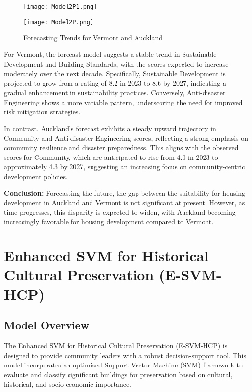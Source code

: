 \documentclass{mcmthesis}
\begin{document}
\begin{figure}[h]
    \centering
    \begin{minipage}{.5\textwidth}
        \centering
        \texttt{[image: Model2P1.png]} %
        \label{fig:vermont_forecast}
    \end{minipage}%
    \begin{minipage}{.5\textwidth}
        \centering
        \texttt{[image: Model2P.png]} %
        \label{fig:auckland_forecast}
    \end{minipage}
    \caption{Forecasting Trends for Vermont and Auckland}
    \label{fig:forecasts}
\end{figure}

For Vermont, the forecast model suggests a stable trend in Sustainable Development and Building Standards, with the scores expected to increase moderately over the next decade. Specifically, Sustainable Development is projected to grow from a rating of 8.2 in 2023 to 8.6 by 2027, indicating a gradual enhancement in sustainability practices. Conversely, Anti-disaster Engineering shows a more variable pattern, underscoring the need for improved risk mitigation strategies.

In contrast, Auckland's forecast exhibits a steady upward trajectory in Community and Anti-disaster Engineering scores, reflecting a strong emphasis on community resilience and disaster preparedness. This aligns with the observed scores for Community, which are anticipated to rise from 4.0 in 2023 to approximately 4.3 by 2027, suggesting an increasing focus on community-centric development policies.

\textbf{Conclusion:} Forecasting the future, the gap between the suitability for housing development in Auckland and Vermont is not significant at present. However, as time progresses, this disparity is expected to widen, with Auckland becoming increasingly favorable for housing development compared to Vermont.

\section{Enhanced SVM for Historical Cultural Preservation (E-SVM-HCP)}

\subsection{Model Overview}
The Enhanced SVM for Historical Cultural Preservation (E-SVM-HCP) is designed to provide community leaders with a robust decision-support tool. This model incorporates an optimized Support Vector Machine (SVM) framework to evaluate and classify significant buildings for preservation based on cultural, historical, and socio-economic importance.
\end{document}
